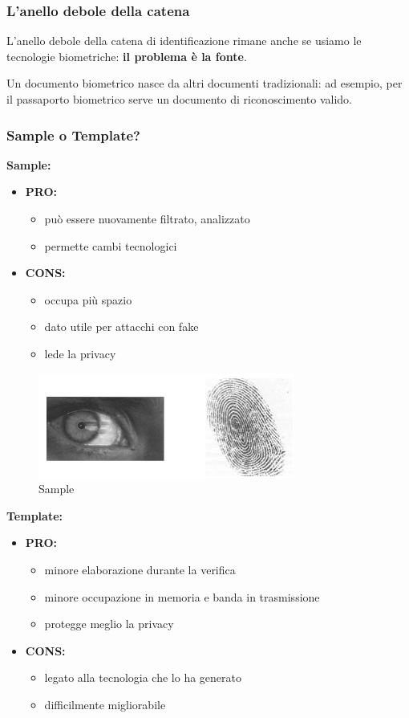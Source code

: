 \subsubsection{L'anello debole della catena}

L'anello debole della catena di identificazione rimane anche se usiamo le tecnologie biometriche: \textbf{il problema è la fonte}.

Un documento biometrico nasce da altri documenti tradizionali: ad esempio, per il passaporto biometrico serve un documento di riconoscimento valido.

\subsubsection{Sample o Template?}

\textbf{Sample:}
\begin{itemize}
    \item \textbf{PRO:}
    \begin{itemize}
        \item può essere nuovamente filtrato, analizzato
        \item permette cambi tecnologici
    \end{itemize}
    \item \textbf{CONS:}
    \begin{itemize}
        \item occupa più spazio
        \item dato utile per attacchi con fake
        \item lede la privacy
    \end{itemize}
\end{itemize}

\begin{figure}[h]
    \centering
    \includegraphics[width=0.5\linewidth]{chapters/images-chap1/sample.png}
    \caption{Sample}
    \label{fig:sample}
\end{figure}

\textbf{Template:}
\begin{itemize}
    \item \textbf{PRO:}
    \begin{itemize}
        \item minore elaborazione durante la verifica
        \item minore occupazione in memoria e banda in trasmissione
        \item protegge meglio la privacy
    \end{itemize}
    \item \textbf{CONS:}
    \begin{itemize}
        \item legato alla tecnologia che lo ha generato
        \item difficilmente migliorabile
    \end{itemize}
\end{itemize}

